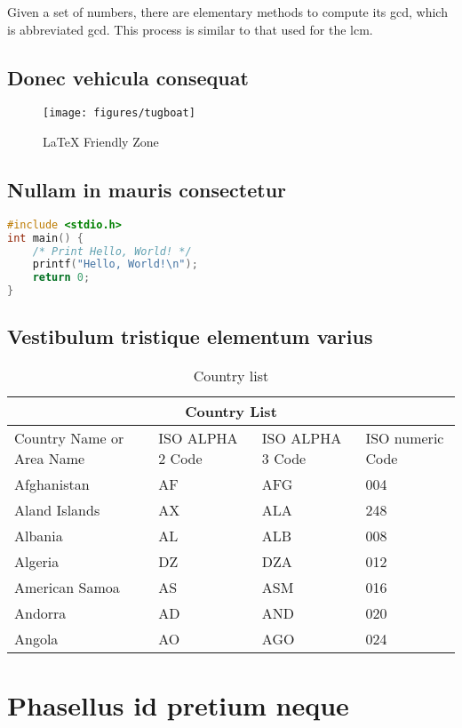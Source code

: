 Given a set of numbers, there are elementary methods to compute its \acrlong{gcd}, which is abbreviated \acrshort{gcd}. This process is similar to that used for the \acrfull{lcm}.

\subsection{Donec vehicula consequat}
\blindtext

\begin{figure}[!ht]
    \centering
    \texttt{[image: figures/tugboat]}
    \caption{\LaTeX{} Friendly Zone \label{o:latex_friendly_zone}}
\end{figure}

\subsection{Nullam in mauris consectetur}
\blindtext

\begin{lstlisting}[language=C,caption={Program, ktorý pozdraví celý svet}]
#include <stdio.h>
int main() {
    /* Print Hello, World! */
    printf("Hello, World!\n");
    return 0;
}
\end{lstlisting}


\subsection{Vestibulum tristique elementum varius}
\blindtext

\begin{table}[!ht]
	\caption{Country list}\label{t:1}
	\smallskip
	\centering

	\begin{tabular}{ |p{3cm}||p{3cm}|p{3cm}|p{3cm}|  }
		\hline
		\multicolumn{4}{|c|}{Country List} \\
		\hline
		Country Name or Area Name& ISO ALPHA 2 Code &ISO ALPHA 3 Code&ISO numeric Code\\
		\hline
		Afghanistan & AF & AFG & 004\\
		Aland Islands & AX & ALA & 248\\
		Albania & AL & ALB & 008\\
		Algeria & DZ & DZA & 012\\
		American Samoa & AS & ASM & 016\\
		Andorra & AD & AND & 020\\
		Angola & AO & AGO & 024\\
		\hline
	\end{tabular}
\end{table}


\section{Phasellus id pretium neque}
\blindtext

\blindtext
